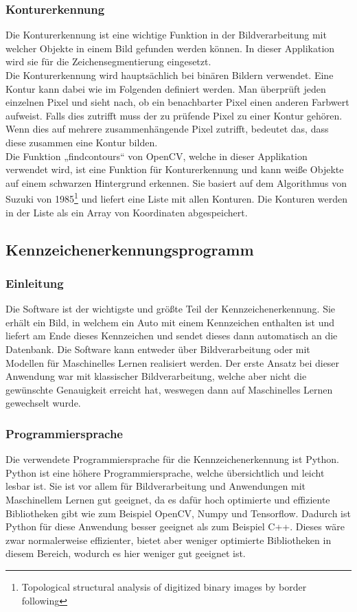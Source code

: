 \subsubsection{Konturerkennung}
Die Konturerkennung ist eine wichtige Funktion in der Bildverarbeitung mit welcher Objekte in einem Bild gefunden werden können. 
In dieser Applikation wird sie für die Zeichensegmentierung eingesetzt.\\

Die Konturerkennung wird hauptsächlich bei binären Bildern verwendet. Eine Kontur kann dabei wie im Folgenden definiert werden. 
Man überprüft jeden einzelnen Pixel und sieht nach, ob ein benachbarter Pixel einen anderen Farbwert aufweist. Falls dies 
zutrifft muss der zu prüfende Pixel zu einer Kontur gehören. Wenn dies auf mehrere zusammenhängende Pixel zutrifft, bedeutet 
das, dass diese zusammen eine Kontur bilden.\\

Die Funktion „findcontours“ von OpenCV, welche in dieser Applikation verwendet wird, ist eine Funktion für Konturerkennung 
und kann weiße Objekte auf einem schwarzen Hintergrund erkennen. Sie basiert auf dem Algorithmus von Suzuki von 
1985\footnote{Topological structural analysis of digitized binary images by border following} und 
liefert eine Liste mit allen Konturen. Die Konturen werden in der Liste als ein Array von Koordinaten abgespeichert.

\subsection{Kennzeichenerkennungsprogramm}

\subsubsection{Einleitung}
Die Software ist der wichtigste und größte Teil der Kennzeichenerkennung. Sie erhält ein Bild, in welchem ein Auto mit 
einem Kennzeichen enthalten ist und liefert am Ende dieses Kennzeichen und sendet dieses dann automatisch an die Datenbank. 
Die Software kann entweder über Bildverarbeitung oder mit Modellen für Maschinelles Lernen realisiert werden. Der erste Ansatz bei 
dieser Anwendung war mit klassischer Bildverarbeitung, welche aber nicht die gewünschte Genauigkeit erreicht hat, weswegen 
dann auf Maschinelles Lernen gewechselt wurde.

\subsubsection{Programmiersprache}
Die verwendete Programmiersprache für die Kennzeichenerkennung ist Python. Python ist eine höhere Programmiersprache, 
welche übersichtlich und leicht lesbar ist. Sie ist vor allem für Bildverarbeitung und Anwendungen mit Maschinellem Lernen gut geeignet, 
da es dafür hoch optimierte und effiziente Bibliotheken gibt wie zum Beispiel OpenCV, Numpy und Tensorflow. Dadurch ist Python 
für diese Anwendung besser geeignet als zum Beispiel C++. Dieses wäre zwar normalerweise effizienter, bietet aber weniger 
optimierte Bibliotheken in diesem Bereich, wodurch es hier weniger gut geeignet ist.

